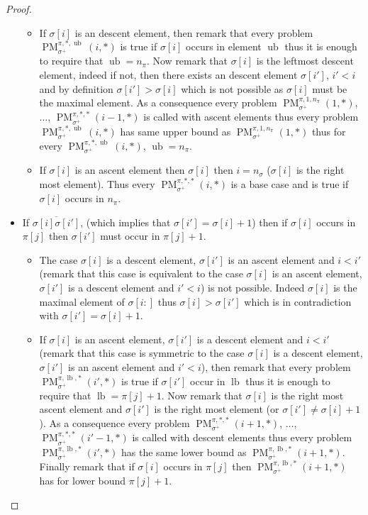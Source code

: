 \documentclass[a4paper]{llncs}
\newcommand{\ptext}{\pi}
\newcommand{\pmotif}{\sigma}
\newcommand{\pbmotif}{\pmotif^+}
\DeclareMathOperator{\PMa}{PM}
\newcommand{\PM}[6]{\PMa_{{#1}}^{{#2},{#3},{#4}}({#5},{#6})}
\DeclareMathOperator{\lb}{lb}
\DeclareMathOperator{\ub}{ub}
\begin{document}
\begin{proof}
\begin{itemize}
\begin{itemize}
		\item If $\sigma[i]$ is an descent element, then remark that 
		every problem 
		$\PM{\pbmotif}{\ptext}{*}{\ub}{i}{*}$ is true if $\sigma[i]$ occurs in element $\ub$ thus it is enough to require that $\ub=n_{\ptext}$.
		Now remark that $\sigma[i]$ is the leftmost descent element, indeed if not, then there exists an descent element $\sigma[i']$, $i'<i$ and by definition $\sigma[i']>\sigma[i]$ which is not possible as $\sigma[i]$ must be the maximal element. As a consequence every problem $\PM{\pbmotif}{\ptext}{1}{n_{\ptext}}{1}{*}$, $\dots$, $\PM{\pbmotif}{\ptext}{*}{*}{i-1}{*}$ is called with ascent elements thus every problem 
		$\PM{\pbmotif}{\ptext}{*}{\ub}{i}{*}$ has same upper bound as $\PM{\pbmotif}{\ptext}{1}{n_{\ptext}}{1}{*}$ thus for every $\PM{\pbmotif}{\ptext}{*}{\ub}{i}{*}$,
		$\ub=n_{\ptext}$.	
		
		
		\item If $\sigma[i]$ is an ascent element then $\sigma[i]$ then $i=n_\pmotif$ ($\sigma[i]$ is the right most element). Thus every $\PM{\pbmotif}{\ptext}{*}{*}{i}{*}$ is a base case and is true if $\sigma[i]$ occurs in $n_{\ptext}$.

	\end{itemize}



	\item  If $\overline{\pmotif[i]\pmotif[i']}$,  (which implies that $\pmotif[i']=\pmotif[i]+1$) then if $\pmotif[i]$ occurs in $\ptext[j]$ then $\pmotif[i']$ must occur in $\ptext[j]+1$.
		\begin{itemize}

			\item The case $\pmotif[i]$ is a descent element, $\pmotif[i']$ is an ascent element and $i<i'$ (remark that this case is equivalent to the case $\pmotif[i]$ is an ascent element, $\pmotif[i']$ is a descent element and $i'<i$) is not possible. 
			Indeed $\pmotif[i]$ is the maximal element of $\pmotif[i:]$ thus $\pmotif[i] > \pmotif[i']$ which is in contradiction with 
			$\pmotif[i']=\pmotif[i]+1$. 
			
			\item If $\pmotif[i]$ is an ascent element, $\pmotif[i']$ is a descent element and $i<i'$ (remark that this case is symmetric to the case $\pmotif[i]$ is a descent element, $\pmotif[i']$ is an ascent element and $i'<i$), then
			remark that every problem 
			$\PM{\pbmotif}{\ptext}{\lb}{*}{i'}{*}$ is true if $\sigma[i']$ occur in $\lb$ thus it is enough to require that $\lb=\ptext[j]+1$.
			Now remark that
			$\pmotif[i]$ is the right most ascent element and $\pmotif[i']$ is the right most element (or $\pmotif[i'] \neq \pmotif[i]+1$). 
			As a consequence every problem $\PM{\pbmotif}{\ptext}{*}{*}{i+1}{*}$, $\dots$, $\PM{\pbmotif}{\ptext}{*}{*}{i'-1}{*}$ is called with descent elements
			thus every problem 
			$\PM{\pbmotif}{\ptext}{\lb}{*}{i'}{*}$ 
			has the same lower bound as $\PM{\pbmotif}{\ptext}{\lb}{*}{i+1}{*}$.
			Finally remark that if $\pmotif[i]$ occurs in $\ptext[j]$ then  $\PM{\pbmotif}{\ptext}{\lb}{*}{i+1}{*}$ has for lower bound $\ptext[j]+1$.
			

\end{itemize}
\end{itemize}
\end{proof}
\end{document}
